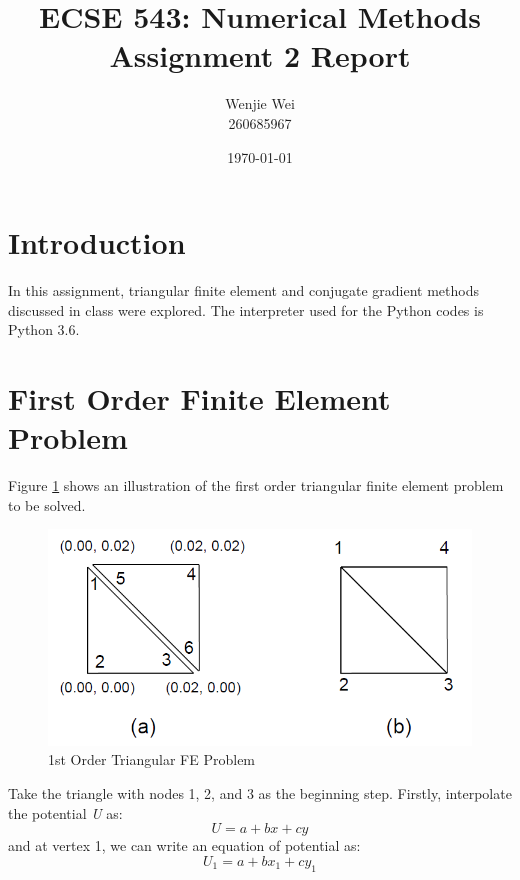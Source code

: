 \documentclass[a4paper,titlepage]{article}
\title{\textbf{ECSE 543: Numerical Methods} \\ Assignment 2 Report}
\author{Wenjie Wei \\ 260685967}
\date{\today}
\begin{document}
	\sloppy
	\maketitle
	
	\tableofcontents
	\newpage
	
	\section*{Introduction}
		In this assignment, triangular finite element and conjugate gradient methods discussed in class were explored. The interpreter used for the Python codes is Python 3.6. 
		
	\section{First Order Finite Element Problem}
		Figure \ref{prob} shows an illustration of the first order triangular finite element problem to be solved. 
		\begin{figure}[!h]
			\centering
			\includegraphics[width=0.7\linewidth]{prob}
			\caption{1st Order Triangular FE Problem}
			\label{prob}
		\end{figure}
	
		Take the triangle with nodes 1, 2, and 3 as the beginning step. Firstly, interpolate the potential \textit{U} as:
		$$
			U = a + bx + cy
		$$
		and at vertex 1, we can write an equation of potential as:
		$$
			U_1 = a + bx_1 + cy_1
		$$
		
\end{document}
